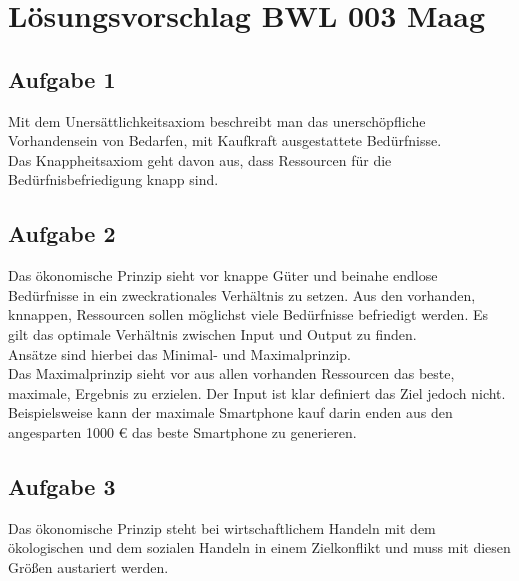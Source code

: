 \documentclass{article}
\begin{document}
	\section*{Lösungsvorschlag BWL 003 Maag}
	\subsection*{Aufgabe 1}
	Mit dem Unersättlichkeitsaxiom beschreibt man das unerschöpfliche Vorhandensein von Bedarfen, mit Kaufkraft ausgestattete Bedürfnisse. \\
	Das Knappheitsaxiom geht davon aus, dass Ressourcen für die Bedürfnisbefriedigung knapp sind.
	
	\subsection*{Aufgabe 2}
	Das ökonomische Prinzip sieht vor knappe Güter und beinahe endlose Bedürfnisse in ein zweckrationales Verhältnis zu setzen. Aus den vorhanden, knnappen, Ressourcen sollen möglichst viele Bedürfnisse befriedigt werden. Es gilt das optimale Verhältnis zwischen Input und Output zu finden. \\
	Ansätze sind hierbei das Minimal- und Maximalprinzip. \\
	Das Maximalprinzip sieht vor aus allen vorhanden Ressourcen das beste, maximale, Ergebnis zu erzielen. Der Input ist klar definiert das Ziel jedoch nicht. Beispielsweise kann der maximale Smartphone kauf darin enden aus den angesparten 1000 € das beste Smartphone zu generieren. \\
	
	\subsection*{Aufgabe 3}
	Das ökonomische Prinzip steht bei wirtschaftlichem Handeln mit dem ökologischen und dem sozialen Handeln in einem Zielkonflikt und muss mit diesen Größen austariert werden.
	
\end{document}
